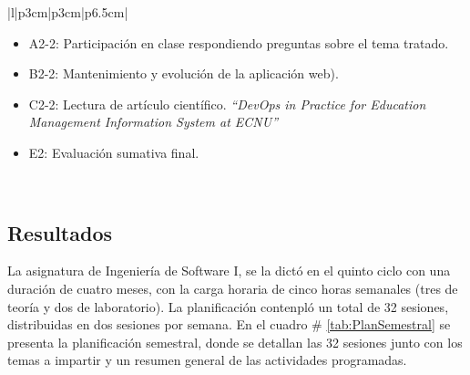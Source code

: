 \documentclass[12pt]{article}
\begin{document}
\begin{longtable}{|l|p{3cm}|p{3cm}|p{6.5cm}|}
                         \begin{minipage}[H]{1.0\linewidth}
                           \vspace{2pt}
                           \begin{itemize}[leftmargin=10pt]
                           \item A2-2: Participación en clase respondiendo preguntas sobre el tema tratado.
                           \item B2-2: Mantenimiento y evolución de la aplicación web).
                           \item C2-2: Lectura de artículo científico. \textit{``DevOps in Practice for Education Management Information System at ECNU''}
                           \item E2: Evaluación sumativa final.
                           \end{itemize}
                           \vspace{1pt}
                         \end{minipage} \\ \hline
    
\end{longtable}

\begin{multicols}{2}



\section{Resultados}
\label{sec:resultados}

La asignatura de Ingeniería de Software I, se la dictó en el quinto ciclo con una duración de cuatro meses, con la carga horaria de cinco horas semanales (tres de teoría y dos de laboratorio). La planificación contenpló un total de 32 sesiones, distribuidas en dos sesiones por semana. En el cuadro \# \ref{tab:PlanSemestral} se presenta la planificación semestral, donde se detallan las 32 sesiones junto con los temas a impartir y un resumen general de las actividades programadas.
  
  
\end{multicols}
\end{document}
